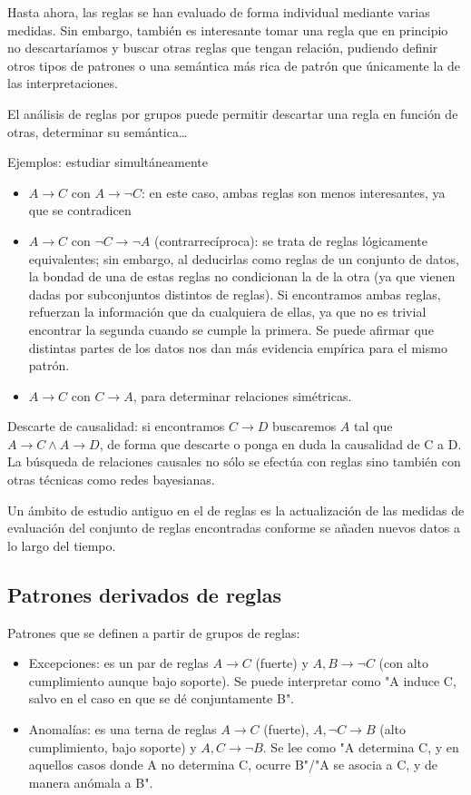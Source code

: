 \documentclass[a4paper,11pt,spanish]{report}
\let\stdsub\subsection
\let\stdsubsub\subsubsection
\renewcommand{\section}{\stdsub}
\renewcommand{\subsection}{\stdsubsub}
\begin{document}
Hasta ahora, las reglas se han evaluado de forma individual mediante varias medidas. Sin embargo, también es interesante tomar una regla que en principio no descartaríamos y buscar otras reglas que tengan relación, pudiendo definir otros tipos de patrones o una semántica más rica de patrón que únicamente la de las interpretaciones.

El análisis de reglas por grupos puede permitir descartar una regla en función de otras, determinar su semántica\ldots{}

Ejemplos: estudiar simultáneamente
\begin{itemize}
\item $A\rightarrow C$ con $A\rightarrow \neg C$: en este caso, ambas reglas son menos interesantes, ya que se contradicen
\item $A\rightarrow C$ con $\neg C\rightarrow \neg A$ (contrarrecíproca): se trata de reglas lógicamente equivalentes; sin embargo, al deducirlas como reglas de un conjunto de datos, la bondad de una de estas reglas no condicionan la de la otra (ya que vienen dadas por subconjuntos distintos de reglas). Si encontramos ambas reglas, refuerzan la información que da cualquiera de ellas, ya que no es trivial encontrar la segunda cuando se cumple la primera. Se puede afirmar que distintas partes de los datos nos dan más evidencia empírica para el mismo patrón.
\item $A\rightarrow C$ con $C\rightarrow A$, para determinar relaciones simétricas.
\end{itemize}

Descarte de causalidad: si encontramos $C\rightarrow D$ buscaremos $A$ tal que $A\rightarrow C \wedge A\rightarrow D$, de forma que descarte o ponga en duda la causalidad de C a D. La búsqueda de relaciones causales no sólo se efectúa con reglas sino también con otras técnicas como redes bayesianas.

Un ámbito de estudio antiguo en el de reglas es la actualización de las medidas de evaluación del conjunto de reglas encontradas conforme se añaden nuevos datos a lo largo del tiempo.

\section{Patrones derivados de reglas}
\label{sec-4-6-1}

Patrones que se definen a partir de grupos de reglas:
\begin{itemize}
\item Excepciones: es un par de reglas $A \rightarrow C$ (fuerte) y $A,B\rightarrow \neg C$ (con alto cumplimiento aunque bajo soporte). Se puede interpretar como "A induce C, salvo en el caso en que se dé conjuntamente B".
\item Anomalías: es una terna de reglas $A \rightarrow C$ (fuerte), $A,\neg C \rightarrow B$ (alto cumplimiento, bajo soporte) y $A, C \rightarrow\neg B$. Se lee como "A determina C, y en aquellos casos donde A no determina C, ocurre B"/"A se asocia a C, y de manera anómala a B".
\end{itemize}
\end{document}
